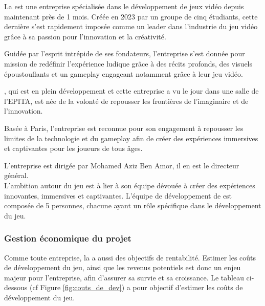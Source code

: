 La \textit{\companyName} est une entreprise spécialisée dans le développement de jeux vidéo depuis maintenant près de 1 mois.
Créée en 2023 par un groupe de cinq étudiants, cette dernière s'est rapidement imposée comme un leader dans l'industrie du jeu vidéo grâce à sa passion pour l'innovation et la créativité. 


Guidée par l'esprit intrépide de ses fondateurs, l'entreprise s'est donnée pour mission de redéfinir l'expérience ludique grâce à des récits profonds, 
des visuels époustouflants et un gameplay engageant notamment grâce à leur jeu vidéo.

\textit{\gameName}, qui est en plein développement et cette entreprise a vu le jour dans une salle de l'EPITA, \companyName est née de la volonté de repousser les frontières de l'imaginaire et de l'innovation.

Basée à Paris, l'entreprise est reconnue pour son engagement à repousser les limites de la technologie et du gameplay afin de créer des expériences immersives et captivantes pour les joueurs de tous âges. 

L'entreprise est dirigée par Mohamed Aziz Ben Amor, il en est le directeur général.
\\

L'ambition autour du jeu \textit{\gameName} est \`a lier \`a son \'equipe d\'evou\'ee \`a cr\'eer des exp\'eriences innovantes, immersives et captivantes. 
L'équipe de développement de \textit{\gameName} est composée de 5 personnes, chacune ayant un rôle spécifique dans le développement du jeu.
\\

\subsubsection*{Gestion économique du projet}

Comme toute entreprise, la \textit{\companyName} a aussi des objectifs de rentabilité.
Estimer les co\^uts de développement du jeu, ainsi que les revenus potentiels est donc un enjeu majeur pour l'entreprise, afin d'assurer sa survie et sa croissance.
Le tableau ci-dessous (cf Figure \ref*{fig:couts_de_dev}) a pour objectif d'estimer les co\^uts de développement du jeu.
\\

